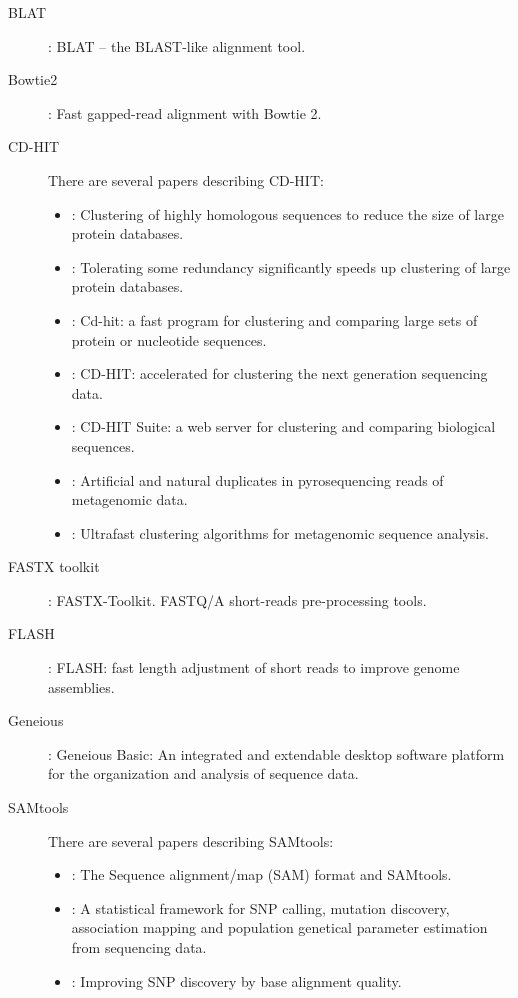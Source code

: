 \documentclass[a4paper, 11pt, twoside]{article}
\begin{document}
\begin{description}
 \item[BLAT] \citet{Kent2002}: BLAT -- the BLAST-like alignment tool.
 \item[Bowtie2] \citet{Langmead2012}: Fast gapped-read alignment with Bowtie 2.
 \item[CD-HIT] There are several papers describing CD-HIT:
  \begin{itemize}
    \item \citet{Li2001}: Clustering of highly homologous sequences to reduce the size of large protein databases.
    \item \citet{Li2002}: Tolerating some redundancy significantly speeds up clustering of large protein databases.
    \item \citet{Li2006}: Cd-hit: a fast program for clustering and comparing large sets of protein or nucleotide sequences.
    \item \citet{Fu2012}: CD-HIT: accelerated for clustering the next generation sequencing data.
    \item \citet{Huang2010}: CD-HIT Suite: a web server for clustering and comparing biological sequences.
    \item \citet{Niu2010}: Artificial and natural duplicates in pyrosequencing reads of metagenomic data.
    \item \citet{Li2012b}: Ultrafast clustering algorithms for metagenomic sequence analysis.
   \end{itemize}
 \item[FASTX toolkit] \citet{Gordon2010}: FASTX-Toolkit. FASTQ/A short-reads pre-processing tools.
 \item[FLASH] \citet{Magoc2011}: FLASH: fast length adjustment of short reads to improve genome assemblies.
 \item[Geneious] \citet{Kearse2012}: Geneious Basic: An integrated and extendable desktop software platform for the organization and analysis of sequence data.
 \item[SAMtools] There are several papers describing SAMtools:
  \begin{itemize}
   \item \citet{Li2009}: The Sequence alignment/map (SAM) format and SAMtools.
   \item \citet{Li2011}: A statistical framework for SNP calling, mutation discovery, association mapping and population genetical parameter estimation from sequencing data.
   \item \citet{Li2011a}: Improving SNP discovery by base alignment quality.
  \end{itemize}
\end{description}
\end{document}
